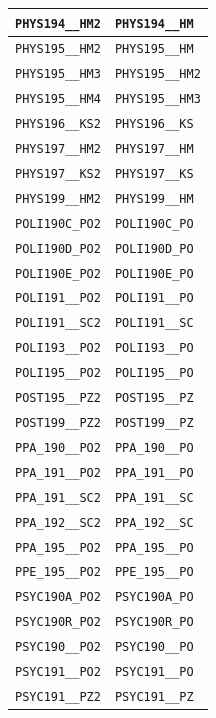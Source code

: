 \begin{longtable}{|p{4.4in}|p{4.4in}|}
    \verb|PHYS194__HM2| & \verb|PHYS194__HM|\\\hline
    \verb|PHYS195__HM2| & \verb|PHYS195__HM|\\\hline
    \verb|PHYS195__HM3| & \verb|PHYS195__HM2|\\\hline
    \verb|PHYS195__HM4| & \verb|PHYS195__HM3|\\\hline
    \verb|PHYS196__KS2| & \verb|PHYS196__KS|\\\hline
    \verb|PHYS197__HM2| & \verb|PHYS197__HM|\\\hline
    \verb|PHYS197__KS2| & \verb|PHYS197__KS|\\\hline
    \verb|PHYS199__HM2| & \verb|PHYS199__HM|\\\hline
    \verb|POLI190C_PO2| & \verb|POLI190C_PO|\\\hline
    \verb|POLI190D_PO2| & \verb|POLI190D_PO|\\\hline
    \verb|POLI190E_PO2| & \verb|POLI190E_PO|\\\hline
    \verb|POLI191__PO2| & \verb|POLI191__PO|\\\hline
    \verb|POLI191__SC2| & \verb|POLI191__SC|\\\hline
    \verb|POLI193__PO2| & \verb|POLI193__PO|\\\hline
    \verb|POLI195__PO2| & \verb|POLI195__PO|\\\hline
    \verb|POST195__PZ2| & \verb|POST195__PZ|\\\hline
    \verb|POST199__PZ2| & \verb|POST199__PZ|\\\hline
    \verb|PPA_190__PO2| & \verb|PPA_190__PO|\\\hline
    \verb|PPA_191__PO2| & \verb|PPA_191__PO|\\\hline
    \verb|PPA_191__SC2| & \verb|PPA_191__SC|\\\hline
    \verb|PPA_192__SC2| & \verb|PPA_192__SC|\\\hline
    \verb|PPA_195__PO2| & \verb|PPA_195__PO|\\\hline
    \verb|PPE_195__PO2| & \verb|PPE_195__PO|\\\hline
    \verb|PSYC190A_PO2| & \verb|PSYC190A_PO|\\\hline
    \verb|PSYC190R_PO2| & \verb|PSYC190R_PO|\\\hline
    \verb|PSYC190__PO2| & \verb|PSYC190__PO|\\\hline
    \verb|PSYC191__PO2| & \verb|PSYC191__PO|\\\hline
    \verb|PSYC191__PZ2| & \verb|PSYC191__PZ|\\\hline

\end{longtable}
